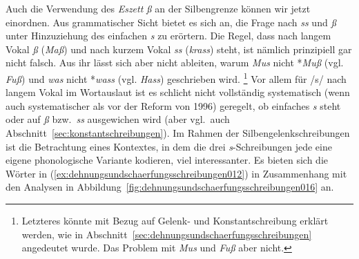 Auch die Verwendung des \textit{Eszett} \textit{ß} an der Silbengrenze können wir jetzt einordnen.
Aus grammatischer Sicht bietet es sich an, die Frage nach \textit{ss} und \textit{ß} unter Hinzuziehung des einfachen \textit{s} zu erörtern.
Die Regel, dass nach langem Vokal \textit{ß} (\textit{Maß}) und nach kurzem Vokal \textit{ss} (\textit{krass}) steht, ist nämlich prinzipiell gar nicht falsch.
Aus ihr lässt sich aber nicht ableiten, warum \zB \textit{Mus} nicht *\textit{Muß} (vgl. \textit{Fuß}) und \textit{was} nicht *\textit{wass} (vgl. \textit{Hass}) geschrieben wird.%
\footnote{Letzteres könnte mit Bezug auf Gelenk- und Konstantschreibung erklärt werden, wie in Abschnitt~\ref{sec:dehnungsundschaerfungsschreibungen} angedeutet wurde.
Das Problem mit \textit{Mus} und \textit{Fuß} aber nicht.}
Vor allem für /s/ nach langem Vokal im Wortauslaut ist es schlicht nicht vollständig systematisch (wenn auch systematischer als vor der Reform von 1996) geregelt, ob einfaches \textit{s} steht oder auf \textit{ß} bzw.\ \textit{ss} ausgewichen wird (aber vgl.\ auch Abschnitt~\ref{sec:konstantschreibungen}).
Im Rahmen der Silbengelenkschreibungen ist die Betrachtung eines Kontextes, in dem die drei \textit{s}-Schreibungen jede eine eigene phonologische Variante kodieren, viel interessanter.
Es bieten sich die Wörter in (\ref{ex:dehnungsundschaerfungsschreibungen012}) in Zusammenhang mit den Analysen in Abbildung~\ref{fig:dehnungsundschaerfungsschreibungen016} an.


\begin{exe}
  \ex\label{ex:dehnungsundschaerfungsschreibungen012}
  \begin{xlist}
  \end{xlist}
\end{exe}

